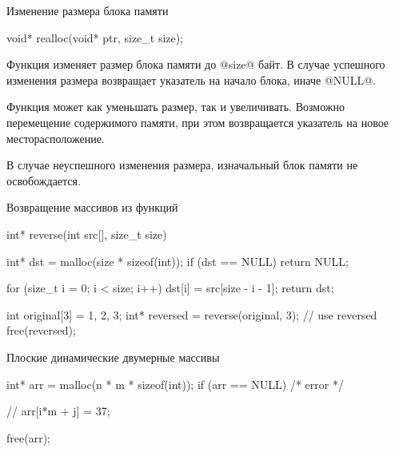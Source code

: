 \begin{frame}[fragile]{Изменение размера блока памяти}

  \begin{clisting}[basicstyle=\ttfamily]
    void* realloc(void* ptr, size_t size);
  \end{clisting}

  Функция изменяет размер блока памяти до @size@ байт. В случае успешного
  изменения размера возвращает указатель на начало блока, иначе @NULL@.

  \pause
  Функция может как уменьшать размер, так и увеличивать. Возможно перемещение
  содержимого памяти, при этом возвращается указатель на новое
  месторасположение.

  \pause
  В случае неуспешного изменения размера, изначальный блок памяти не
  освобождается.


\end{frame}

\begin{frame}[fragile]{Возвращение массивов из функций}

  \begin{clisting}
    int* reverse(int src[], size_t size) {
        int* dst = malloc(size * sizeof(int));
        if (dst == NULL) { return NULL; }

        for (size_t i = 0; i < size; i++) {
            dst[i] = src[size - i - 1];
        }
        return dst;
    }
    int original[3] = {1, 2, 3};
    int* reversed = reverse(original, 3);
    // use reversed
    free(reversed);
  \end{clisting}


\end{frame}

\begin{frame}[fragile]{Плоские динамические двумерные массивы}

  \begin{clisting}
    int* arr = malloc(n * m * sizeof(int));
    if (arr == NULL) { /* error */ }

    // arr[i*m + j] = 37;

    free(arr);
  \end{clisting}


\end{frame}


